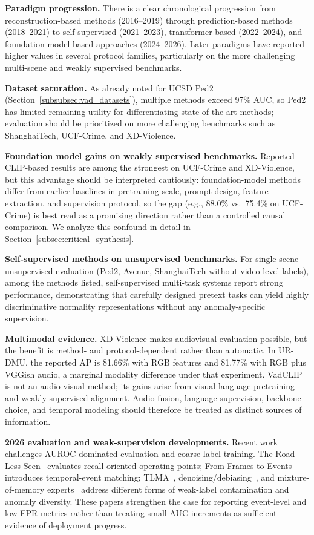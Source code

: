\documentclass[10pt,a4paper]{article}
\begin{document}
\textbf{Paradigm progression.} There is a clear chronological progression from reconstruction-based methods (2016--2019) through prediction-based methods (2018--2021) to self-supervised (2021--2023), transformer-based (2022--2024), and foundation model-based approaches (2024--2026). Later paradigms have reported higher values in several protocol families, particularly on the more challenging multi-scene and weakly supervised benchmarks.

\textbf{Dataset saturation.} As already noted for UCSD Ped2 (Section~\ref{subsubsec:vad_datasets}), multiple methods exceed 97\% AUC, so Ped2 has limited remaining utility for differentiating state-of-the-art methods; evaluation should be prioritized on more challenging benchmarks such as ShanghaiTech, UCF-Crime, and XD-Violence.

\textbf{Foundation model gains on weakly supervised benchmarks.} Reported CLIP-based results are among the strongest on UCF-Crime and XD-Violence, but this advantage should be interpreted cautiously: foundation-model methods differ from earlier baselines in pretraining scale, prompt design, feature extraction, and supervision protocol, so the gap (e.g., 88.0\% vs.\ 75.4\% on UCF-Crime) is best read as a promising direction rather than a controlled causal comparison. We analyze this confound in detail in Section~\ref{subsec:critical_synthesis}.

\textbf{Self-supervised methods on unsupervised benchmarks.} For single-scene unsupervised evaluation (Ped2, Avenue, ShanghaiTech without video-level labels), among the methods listed, self-supervised multi-task systems report strong performance, demonstrating that carefully designed pretext tasks can yield highly discriminative normality representations without any anomaly-specific supervision.

\textbf{Multimodal evidence.} XD-Violence makes audiovisual evaluation possible, but the benefit is method- and protocol-dependent rather than automatic. In UR-DMU, the reported AP is 81.66\% with RGB features and 81.77\% with RGB plus VGGish audio, a marginal modality difference under that experiment. VadCLIP is not an audio-visual method; its gains arise from visual-language pretraining and weakly supervised alignment. Audio fusion, language supervision, backbone choice, and temporal modeling should therefore be treated as distinct sources of information.

\textbf{2026 evaluation and weak-supervision developments.} Recent work challenges AUROC-dominated evaluation and coarse-label training. The Road Less Seen~\citep{acharya2026road} evaluates recall-oriented operating points; From Frames to Events~\citep{rashvand2026frames} introduces temporal-event matching; TLMA~\citep{xu2026tlma}, denoising/debiasing~\citep{zhao2026denoising}, and mixture-of-memory experts~\citep{sun2026memoryexperts} address different forms of weak-label contamination and anomaly diversity. These papers strengthen the case for reporting event-level and low-FPR metrics rather than treating small AUC increments as sufficient evidence of deployment progress.
\end{document}
